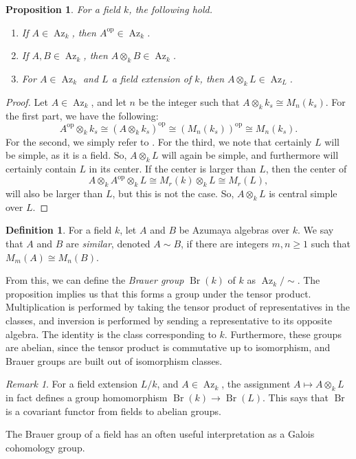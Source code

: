 \documentclass[12pt,twoside]{reedthesis}
\theoremstyle{plain}
\newtheorem{proposition}[theorem]{Proposition}
\theoremstyle{definition}
\newtheorem{definition}{Definition}[section]
\theoremstyle{remark}
\newtheorem{remark}{Remark}[section]
\newcommand{\Br}{\operatorname{Br}}
\newcommand{\Az}{\operatorname{Az}}
\newcommand{\op}{^{\text{op}}}
\begin{document}
\begin{proposition} For a field $k$, the following hold.
\begin{enumerate} 
\item If $A\in\Az_k$, then $A\op\in\Az_k$.
\item If $A,B\in\Az_k$, then $A\otimes_k B\in\Az_k$.
\item For $A\in\Az_k$ and $L$ a field extension of $k$, then $A\otimes_k L\in\Az_L$.
\end{enumerate}
\end{proposition}
\begin{proof}
Let $A\in\Az_k$, and let $n$ be the integer such that $A\otimes_k k_s\cong M_n(k_s)$. For the first part, we have the following:
\[
A\op\otimes_k k_s\cong(A\otimes_k k_s)\op\cong(M_n(k_s))\op\cong M_n(k_s).
\]
For the second, we simply refer to \cite[Theorem 1 on page 114]{jacobson}. For the third, we note that certainly $L$ will be simple, as it is a field. So, $A\otimes_k L$ will again be simple, and furthermore will certainly contain $L$ in its center. If the center is larger than $L$, then the center of 
\[
A\otimes_k A\op\otimes_k L\cong M_r(k)\otimes_k L\cong M_r(L),
\]
will also be larger than $L$, but this is not the case. So, $A\otimes_k L$ is central simple over $L$.
\end{proof}
\begin{definition}
For a field $k$, let $A$ and $B$ be Azumaya algebras over $k$. We say that $A$ and $B$ are \emph{similar}, denoted $A\sim B$, if there are integers $m,n\geq1$ such that $M_m(A)\cong M_n(B)$.
\end{definition}
\noindent From this, we can define the \emph{Brauer group} $\Br(k)$ of $k$ as $\Az_k/\sim$. The proposition implies us that this forms a group under the tensor product. Multiplication is performed by taking the tensor product of representatives in the classes, and inversion is performed by sending a representative to its opposite algebra. The identity is the class corresponding to $k$. Furthermore, these groups are abelian, since the tensor product is commutative up to isomorphism, and Brauer groups are built out of isomorphism classes.
\begin{remark}\label{covariantBr}
For a field extension $L/k$, and $A\in\Az_k$, the assignment $A\mapsto A\otimes_k L$ in fact defines a group homomorphism $\Br(k)\to \Br(L)$. This says that $\Br$ is a covariant functor from fields to abelian groups.
\end{remark}
The Brauer group of a field has an often useful interpretation as a Galois cohomology group.
\end{document}
